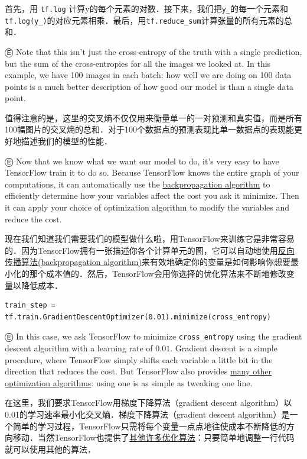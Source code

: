 首先，用 \lstinline{tf.log} 计算y的每个元素的对数．接下来，我们把\lstinline{y_}的每一个元素和\lstinline{tf.log(y_)}的对应元素相乘．最后，用\lstinline{tf.reduce_sum}计算张量的所有元素的总和．

Ⓔ Note that this isn't just the cross-entropy of the truth with a single prediction, but the sum of the cross-entropies for all the images we looked at. In this example, we have 100 images in each batch: how well we are doing on 100 data points is a much better description of how good our model is than a single data point.

值得注意的是，这里的交叉熵不仅仅用来衡量单一的一对预测和真实值，而是所有100幅图片的交叉熵的总和．对于100个数据点的预测表现比单一数据点的表现能更好地描述我们的模型的性能．

Ⓔ Now that we know what we want our model to do, it's very easy to have TensorFlow train it to do so. Because TensorFlow knows the entire graph of your computations, it can automatically use the \href{http://colah.github.io/posts/2015-08-Backprop/}{backpropagation algorithm} to efficiently determine how your variables affect the cost you ask it minimize. Then it can apply your choice of optimization algorithm to modify the variables and reduce the cost.

现在我们知道我们需要我们的模型做什么啦，用TensorFlow来训练它是非常容易的．因为TensorFlow拥有一张描述你各个计算单元的图，它可以自动地使用\href{http://colah.github.io/posts/2015-08-Backprop/}{反向传播算法(backpropagation algorithm)}来有效地确定你的变量是如何影响你想要最小化的那个成本值的．然后，TensorFlow会用你选择的优化算法来不断地修改变量以降低成本．

\begin{lstlisting}
train_step = tf.train.GradientDescentOptimizer(0.01).minimize(cross_entropy)
\end{lstlisting}

Ⓔ In this case, we ask TensorFlow to minimize \lstinline{cross_entropy} using the gradient descent algorithm with a learning rate of $0.01$. Gradient descent is a simple procedure, where TensorFlow simply shifts each variable a little bit in the direction that reduces the cost. But TensorFlow also provides \href{https://www.tensorflow.org/versions/master/api_docs/python/train.html#optimizers}{many other optimization algorithms}: using one is as simple as tweaking one line.

在这里，我们要求TensorFlow用梯度下降算法（gradient descent algorithm）以0.01的学习速率最小化交叉熵．梯度下降算法（gradient descent algorithm）是一个简单的学习过程，TensorFlow只需将每个变量一点点地往使成本不断降低的方向移动．当然TensorFlow也提供了\href{https://www.tensorflow.org/versions/master/api_docs/python/train.html#optimizers}{其他许多优化算法}：只要简单地调整一行代码就可以使用其他的算法．

